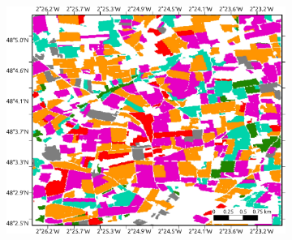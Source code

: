 \documentclass[journal,article,submit,pdftex,moreauthors]{Definitions/mdpi}
\providecommand{\DIFdel}[1]{{\protect\color{red}\sout{#1}}}                      %
\providecommand{\DIFaddend}{} %
\providecommand{\DIFdelFL}[1]{\DIFdel{#1}} %
\providecommand{\DIFaddbeginFL}{} %
\providecommand{\DIFaddendFL}{} %
\providecommand{\DIFdelbeginFL}{} %
\providecommand{\DIFdelendFL}{} %
\begin{document}
\DIFaddend \begin{figure}[H]
    \DIFdelbeginFL %
\DIFdelendFL %
	\DIFaddbeginFL \begin{subfigure}[t]{0.28\linewidth}
	\includegraphics[height=\linewidth,width=\textwidth]{figures/aes_1_layer_mse_results/gt_with_format_v2.pdf}
	\DIFaddendFL \caption{}
	\label{fig:frh04_labels}
	\end{subfigure}\DIFdelbeginFL \DIFdelFL{\hspace{-1.5mm}
	}%
\DIFdelendFL %
	\DIFaddbeginFL \begin{subfigure}[t]{0.28\linewidth}

\end{subfigure}
\end{figure}
\end{document}
